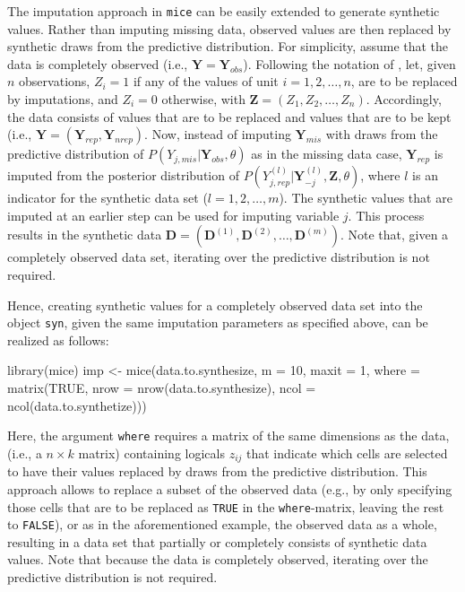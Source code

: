 \documentclass[psych,article,submit,moreauthors,pdftex]{mdpi}
\newenvironment{Shaded}{\begin{snugshade}}{\end{snugshade}}
\newcommand{\AttributeTok}[1]{\textcolor[rgb]{0.77,0.63,0.00}{#1}}
\newcommand{\ConstantTok}[1]{\textcolor[rgb]{0.00,0.00,0.00}{#1}}
\newcommand{\DecValTok}[1]{\textcolor[rgb]{0.00,0.00,0.81}{#1}}
\newcommand{\FunctionTok}[1]{\textcolor[rgb]{0.00,0.00,0.00}{#1}}
\newcommand{\NormalTok}[1]{#1}
\newcommand{\OtherTok}[1]{\textcolor[rgb]{0.56,0.35,0.01}{#1}}
\begin{document}
The imputation approach in \texttt{mice} can be easily extended to
generate synthetic values. Rather than imputing missing data, observed
values are then replaced by synthetic draws from the predictive
distribution. For simplicity, assume that the data is completely
observed (i.e., \(\textbf{Y} = \textbf{Y}_{obs}\)). Following the
notation of \citet{reiter_raghunathan_multiple_2007}, let, given \(n\)
observations, \(Z_i = 1\) if any of the values of unit
\(i = 1, 2, \dots, n\), are to be replaced by imputations, and
\(Z_i = 0\) otherwise, with \(\textbf{Z} = (Z_1, Z_2, \dots, Z_n)\).
Accordingly, the data consists of values that are to be replaced and
values that are to be kept (i.e.,
\(\textbf{Y} = (\textbf{Y}_{rep}, \textbf{Y}_{nrep})\). Now, instead of
imputing \(\textbf{Y}_{mis}\) with draws from the predictive
distribution of \(P(Y_{j, mis} | \textbf{Y}_{obs}, \theta)\) as in the
missing data case, \(\textbf{Y}_{rep}\) is imputed from the posterior
distribution of
\(P(Y^{(l)}_{j, rep} | \textbf{Y}^{(l)}_{-j}, \textbf{Z}, \theta)\),
where \(l\) is an indicator for the synthetic data set
(\(l = 1, 2, \dots, m\)). The synthetic values that are imputed at an
earlier step can be used for imputing variable \(j\). This process
results in the synthetic data
\(\textbf{D} = (\textbf{D}^{(1)}, \textbf{D}^{(2)}, \dots, \textbf{D}^{(m)})\).
Note that, given a completely observed data set, iterating over the
predictive distribution is not required.

Hence, creating synthetic values for a completely observed data set into
the object \texttt{syn}, given the same imputation parameters as
specified above, can be realized as follows:

\begin{Shaded}
\begin{Highlighting}[]
\FunctionTok{library}\NormalTok{(mice)}
\NormalTok{imp }\OtherTok{\textless{}{-}} \FunctionTok{mice}\NormalTok{(data.to.synthesize, }
            \AttributeTok{m =} \DecValTok{10}\NormalTok{,}
            \AttributeTok{maxit =} \DecValTok{1}\NormalTok{,}
            \AttributeTok{where =} \FunctionTok{matrix}\NormalTok{(}\ConstantTok{TRUE}\NormalTok{,}
                           \AttributeTok{nrow =} \FunctionTok{nrow}\NormalTok{(data.to.synthesize),}
                           \AttributeTok{ncol =} \FunctionTok{ncol}\NormalTok{(data.to.synthetize)))}
\end{Highlighting}
\end{Shaded}

Here, the argument \texttt{where} requires a matrix of the same
dimensions as the data, (i.e., a \(n \times k\) matrix) containing
logicals \(z_{ij}\) that indicate which cells are selected to have their
values replaced by draws from the predictive distribution. This approach
allows to replace a subset of the observed data (e.g., by only
specifying those cells that are to be replaced as \texttt{TRUE} in the
\texttt{where}-matrix, leaving the rest to \texttt{FALSE}), or as in the
aforementioned example, the observed data as a whole, resulting in a
data set that partially or completely consists of synthetic data values.
Note that because the data is completely observed, iterating over the
predictive distribution is not required.
\end{document}

